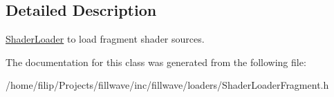 \subsection{Detailed Description}
\hyperlink{classfillwave_1_1loader_1_1ShaderLoader}{Shader\+Loader} to load fragment shader sources. 

The documentation for this class was generated from the following file\+:\begin{DoxyCompactItemize}
\item 
/home/filip/\+Projects/fillwave/inc/fillwave/loaders/Shader\+Loader\+Fragment.\+h\end{DoxyCompactItemize}
